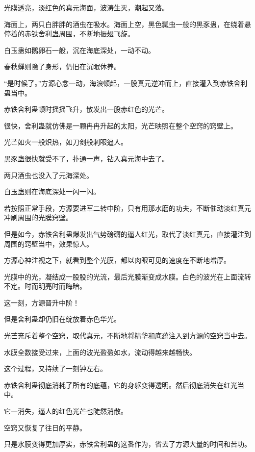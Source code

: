 
\begin{this_body}



光膜透亮，淡红色的真元海面，波涛生灭，潮起又落。

海面上，两只白胖胖的酒虫在吸水。海面上空，黑色瓢虫一般的黒豕蛊，在绕着悬停着的赤铁舍利蛊周围，不断地振翅飞旋。

白玉蛊如鹅卵石一般，沉在海底深处，一动不动。

春秋蝉则隐了身形，仍旧在沉眠休养。

“是时候了。”方源心念一动，海浪顿起，一股真元逆冲而上，直接灌入到赤铁舍利蛊当中。

赤铁舍利蛊顿时摇摇飞升，散发出一股赤红色的光芒。

很快，舍利蛊就仿佛是一颗冉冉升起的太阳，光芒映照在整个空窍的窍壁上。

光芒如火一般炽热，如刀剑般刺眼逼人。

黒豕蛊很快就受不了，扑通一声，钻入真元海中去了。

两只酒虫也没入了元海深处。

白玉蛊则在海底深处一闪一闪。

若按照正常手段，方源要进军二转中阶，只有用那水磨的功夫，不断催动淡红真元冲刷周围的光膜窍壁。

但是如今，赤铁舍利蛊爆发出气势磅礴的逼人红光，取代了淡红真元，直接灌注到周围的窍壁当中，效果惊人。

方源心神注视之下，就看到整个光膜，都以肉眼可见的速度在不断地增厚。

光膜中的光，凝结成一股股的光流，最后光膜渐变成水膜。白色的波光在上面流转不定。时而明亮时而晦暗。

这一刻，方源晋升中阶！

但是舍利蛊却仍旧在绽放着赤色华光。

光芒充斥着整个空窍，取代真元，不断地将精华和底蕴注入到方源的空窍当中去。

水膜全数接受过来，上面的波光盈盈如水，流动得越来越畅快。

这个过程，又持续了一刻钟左右。

赤铁舍利蛊彻底消耗了所有的底蕴，它的身躯变得透明。然后彻底消失在红光当中。

它一消失，逼人的红色光芒也陡然消散。

空窍又恢复了往日的平静。

只是水膜变得更加厚实，赤铁舍利蛊的这番作为，省去了方源大量的时间和苦功。


\end{this_body}
